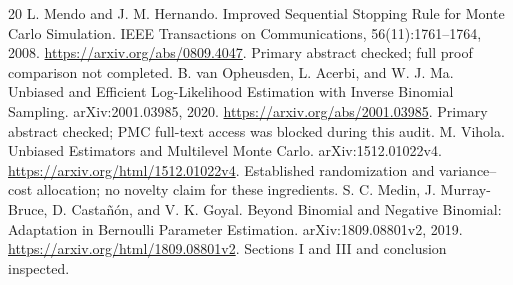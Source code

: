 \documentclass[11pt]{article}
\theoremstyle{definition}\newtheorem{conjecture}[theorem]{Conjecture}
\theoremstyle{remark}\newtheorem{remark}[theorem]{Remark}
\begin{document}
\begin{thebibliography}{20}
 L. Mendo and J. M. Hernando. Improved Sequential Stopping Rule for Monte Carlo Simulation. IEEE Transactions on Communications, 56(11):1761--1764, 2008. \url{https://arxiv.org/abs/0809.4047}. Primary abstract checked; full proof comparison not completed.
 B. van Opheusden, L. Acerbi, and W. J. Ma. Unbiased and Efficient Log-Likelihood Estimation with Inverse Binomial Sampling. arXiv:2001.03985, 2020. \url{https://arxiv.org/abs/2001.03985}. Primary abstract checked; PMC full-text access was blocked during this audit.
 M. Vihola. Unbiased Estimators and Multilevel Monte Carlo. arXiv:1512.01022v4. \url{https://arxiv.org/html/1512.01022v4}. Established randomization and variance--cost allocation; no novelty claim for these ingredients.
 S. C. Medin, J. Murray-Bruce, D. Casta\~n\'{o}n, and V. K. Goyal. Beyond Binomial and Negative Binomial: Adaptation in Bernoulli Parameter Estimation. arXiv:1809.08801v2, 2019. \url{https://arxiv.org/html/1809.08801v2}. Sections I and III and conclusion inspected.
\end{thebibliography}
\end{document}
